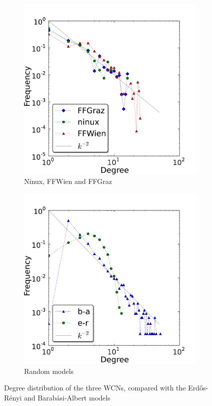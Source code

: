 \documentclass[a4paper,11pt,twoside,openright]{memoir}
\begin{document}
\begin{figure}[hbt]
  \centering
  \begin{subfigure}[b]{0.49\textwidth}
    \includegraphics{graphs/degree_distribution_wcn.pdf}
    \caption{Ninux, FFWien and FFGraz}
    \label{fig:deg_wcn}
  \end{subfigure}
  \begin{subfigure}[b]{0.49\textwidth}
    \includegraphics{graphs/degree_distribution_syn.pdf}
    \caption{Random models}
    \label{fig:deg_syn}
  \end{subfigure}
  \caption{Degree distribution of the three WCNs, compared with the
    Erd\H{o}s-Rényi and Barabási-Albert models}
  \label{fig:deg_com}
\end{figure}
\end{document}
